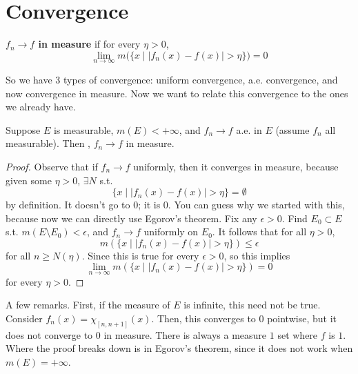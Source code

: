 \section{Convergence} 

  \begin{definition}
    \textbf{$f_n \to f$ in measure} if for every $\eta > 0$, 
    \begin{equation}
      \lim_{n \to \infty} m \big( \{x \mid |f_n (x) - f(x)|  > \eta \}\big) = 0
    \end{equation}
  \end{definition}

  So we have 3 types of convergence: uniform convergence, a.e. convergence, and now convergence in measure. Now we want to relate this convergence to the ones we already have. 

  \begin{theorem}
    Suppose $E$ is measurable, $m(E) < +\infty$, and $f_n \to f$ a.e. in $E$ (assume $f_n$ all measurable). Then , $f_n \to f$ in measure. 
  \end{theorem}
  \begin{proof}
    Observe that if $f_n \to f$ uniformly, then it converges in measure, because given some $\eta > 0$, $\exists N$ s.t. 
    \begin{equation}
      \{ x \mid |f_n (x) - f(x) | > \eta \} = \emptyset
    \end{equation}
    by definition. It doesn't go to $0$; it is $0$. You can guess why we started with this, because now we can directly use Egorov's theorem. Fix any $\epsilon > 0$. Find $E_0 \subset E$ s.t. $m (E \setminus E_0) < \epsilon$, and $f_n \to f$ uniformly on $E_0$. It follows that for all $\eta > 0$, 
    \begin{equation}
      m(\{x \mid |f_n (x) - f(x)| > \eta\}) \leq \epsilon 
    \end{equation}
    for all $n \geq N(\eta)$. Since this is true for every $\epsilon > 0$, so this implies
    \begin{equation}
      \lim_{n \to \infty} m(\{ x \mid |f_n (x) - f(x)| > \eta\}) = 0
    \end{equation} 
    for every $\eta > 0$. 
  \end{proof}

  A few remarks. First, if the measure of $E$ is infinite, this need not be true. Consider $f_n (x) = \chi_{[n, n+1]} (x)$. Then, this converges to $0$ pointwise, but it does not converge to $0$ in measure. There is always a measure $1$ set where $f$ is $1$. Where the proof breaks down is in Egorov's theorem, since it does not work when $m(E) = +\infty$. 

